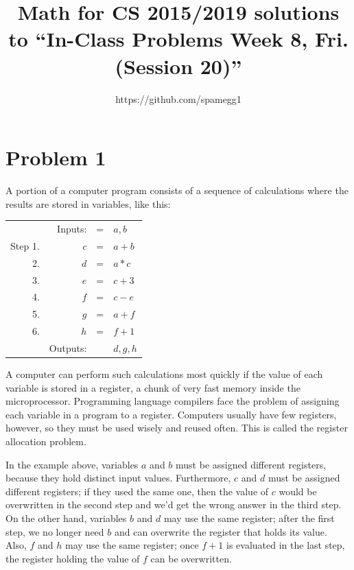 \documentclass[14pt]{extarticle}
\title{Math for CS 2015/2019 solutions to ``In-Class Problems Week 8, Fri. (Session 20)''}
\author{https://github.com/spamegg1}
\begin{document}
\maketitle
\tableofcontents

\section{Problem 1}
A portion of a computer program consists of a sequence of calculations where the results are stored in variables, like this:

\begin{center}
\begin{tabular}{rrcl}
& Inputs: & = & $a, b$ \\
Step 1.  & $c$ & = & $a+b$ \\
2. & $d$ & = & $a*c$\\
3. & $e$ & = & $c+3$\\
4. & $f$ & = & $c-e$\\
5. & $g$ & = & $a+f$\\
6. & $h$ & = & $f+1$\\
& Outputs: & & $d,g,h$
\end{tabular}
\end{center}

A computer can perform such calculations most quickly if the value of each variable is stored in a register, a chunk of very fast memory inside the microprocessor. Programming language compilers face the problem of assigning each variable in a program to a register. Computers usually have few registers, however, so they
must be used wisely and reused often. This is called the register allocation problem.

In the example above, variables $a$ and $b$ must be assigned different registers, because they hold distinct input values. Furthermore, $c$ and $d$ must be assigned different registers; if they used the same one, then the value of $c$ would be overwritten in the second step and we'd get the wrong answer in the third step. On the other hand, variables $b$ and $d$ may use the same register; after the first step, we no longer need $b$ and can overwrite the register that holds its value. Also, $f$ and $h$ may use the same register; once $f + 1$ is evaluated in the last step, the register holding the value of $f$ can be overwritten.
\end{document}
